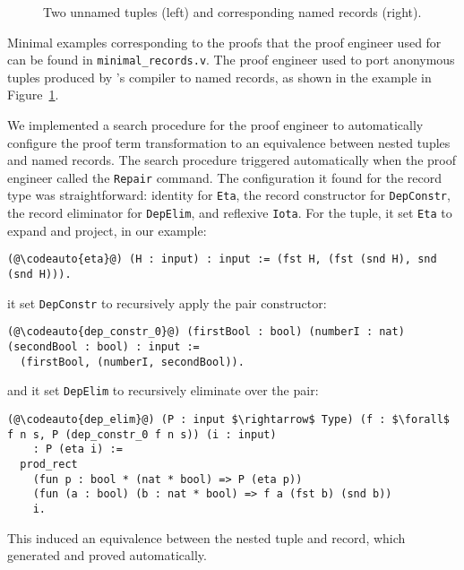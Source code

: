 \begin{figure}
\begin{minipage}{0.25\textwidth}
   
\end{minipage}
\hfill
\begin{minipage}{0.74\textwidth}
   
\end{minipage}
\caption{Two unnamed tuples (left) and corresponding named records (right).}
\label{fig:records}
\end{figure}

Minimal examples corresponding to the proofs that the proof engineer used \toolname for
can be found in \lstinline{minimal_records.v}.
The proof engineer used \toolname to port anonymous tuples produced by \company's compiler
to named records, as shown in the example in Figure~\ref{fig:records}.

We implemented a search procedure for the proof engineer to automatically configure the proof term transformation to an equivalence
between nested tuples and named records.
The search procedure triggered automatically when the proof engineer called the \lstinline{Repair} command.
The configuration it found for the record type was straightforward: identity for \lstinline{Eta},
the record constructor for \lstinline{DepConstr}, the record eliminator for \lstinline{DepElim}, and reflexive \lstinline{Iota}.
For the tuple, it set \lstinline{Eta} to expand and project, in our example:
\begin{lstlisting}
(@\codeauto{eta}@) (H : input) : input := (fst H, (fst (snd H), snd (snd H))).
\end{lstlisting}
it set \lstinline{DepConstr} to recursively apply the pair constructor:

\begin{lstlisting}
(@\codeauto{dep_constr_0}@) (firstBool : bool) (numberI : nat) (secondBool : bool) : input :=
  (firstBool, (numberI, secondBool)).
\end{lstlisting}
and it set \lstinline{DepElim} to recursively eliminate over the pair:

\begin{lstlisting}
(@\codeauto{dep_elim}@) (P : input $\rightarrow$ Type) (f : $\forall$ f n s, P (dep_constr_0 f n s)) (i : input)
    : P (eta i) :=
  prod_rect
    (fun p : bool * (nat * bool) => P (eta p))
    (fun (a : bool) (b : nat * bool) => f a (fst b) (snd b))
    i.
\end{lstlisting}
This induced an equivalence between the nested tuple and record,
which \toolname generated and proved automatically.

